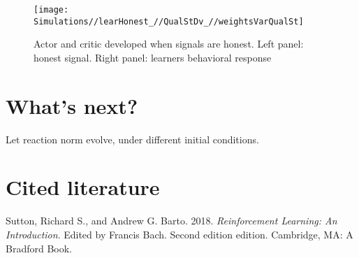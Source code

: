 \documentclass[]{article}
\begin{document}
\begin{figure}
\texttt{[image: Simulations//learHonest\_//QualStDv\_//weightsVarQualSt]} \caption{\label{fig:honest_learn}Actor and critic developed when signals are honest. Left panel: honest signal. Right panel: learners behavioral response }\label{fig:fig9}
\end{figure}

\hypertarget{whats-next}{%
\section{What's next?}\label{whats-next}}

Let reaction norm evolve, under different initial conditions.

\hypertarget{cited-literature}{%
\section*{Cited literature}\label{cited-literature}}

\hypertarget{refs}{}
\leavevmode\hypertarget{ref-sutton_reinforcement_2018}{}%
Sutton, Richard S., and Andrew G. Barto. 2018. \emph{Reinforcement
Learning: An Introduction}. Edited by Francis Bach. Second edition
edition. Cambridge, MA: A Bradford Book.
\end{document}
